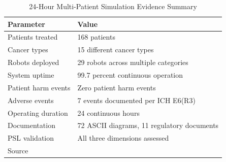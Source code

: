 \begin{table}[H]
\centering
\caption{24-Hour Multi-Patient Simulation Evidence Summary}
\label{tab:multi-patient}
\small
\begin{tabularx}{\textwidth}{l X}
\toprule
\textbf{Parameter} & \textbf{Value} \\
\midrule
Patients treated & 168 patients \\
Cancer types & 15 different cancer types \\
Robots deployed & 29 robots across multiple categories \\
System uptime & 99.7 percent continuous operation \\
Patient harm events & Zero patient harm events \\
Adverse events & 7 events documented per ICH E6(R3) \\
Operating duration & 24 continuous hours \\
Documentation & 72 ASCII diagrams, 11 regulatory documents \\
PSL validation & All three dimensions assessed \\
Source & \cite{site-docs} \\
\bottomrule
\end{tabularx}
\end{table}
